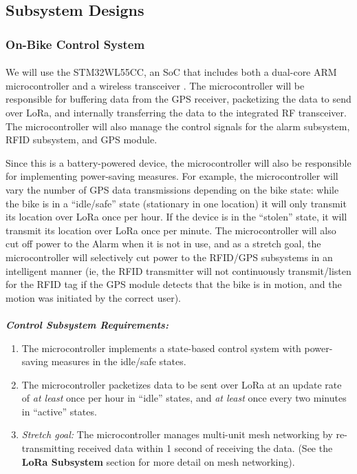 \documentclass{article}
\begin{document}
\subsection{Subsystem Designs} 
\subsubsection{On-Bike Control System}

\paragraph{}
We will use the STM32WL55CC, an SoC that includes both a dual-core ARM microcontroller and a wireless transceiver \cite{stm_datasheet}. The microcontroller will be responsible for buffering data from the GPS receiver, packetizing the data to send over LoRa, and internally transferring the data to the integrated RF transceiver. The microcontroller will also manage the control signals for the alarm subsystem, RFID subsystem, and GPS module. 

Since this is a battery-powered device, the microcontroller will also be responsible for implementing power-saving measures. For example, the microcontroller will vary the number of GPS data transmissions depending on the bike state: while the bike is in a “idle/safe” state (stationary in one location) it will only transmit its location over LoRa once per hour. If the device is in the “stolen” state, it will transmit its location over LoRa once per minute. The microcontroller will also cut off power to the Alarm when it is not in use, and as a stretch goal, the microcontroller will selectively cut power to the RFID/GPS subsystems in an intelligent manner (ie, the RFID transmitter will not continuously transmit/listen for the RFID tag if the GPS module detects that the bike is in motion, and the motion was initiated by the correct user). 
\paragraph{} 

\textit{\textbf{Control Subsystem Requirements:}}

\begin{enumerate}
	\item The microcontroller implements a state-based control system with power-saving measures in the idle/safe states. 
	\item The microcontroller packetizes data to be sent over LoRa at an update rate of \textit{at least }once per hour in “idle” states, and \textit{at least} once every two minutes in “active” states. 
	\item \textit{Stretch goal:} The microcontroller manages multi-unit mesh networking by re-transmitting received data within 1 second of receiving the data. (See the \textbf{LoRa Subsystem} section for more detail on mesh networking). 
\end{enumerate}
\end{document}
